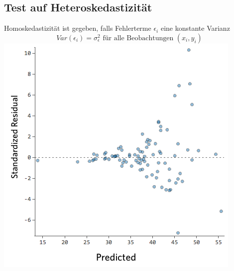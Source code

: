 \subsection{Test auf Heteroskedastizität}
Homoskedastizität ist gegeben, falls Fehlerterme $\epsilon_i$ eine konstante Varianz
\[ Var(\epsilon_i) = \sigma_{\epsilon}^{2} \text{ für alle  Beobachtungen } (x_i, y_i) \] 
\includegraphics[scale=0.5]{VorlesungenTexDateien/images/Heteroscadicity}

